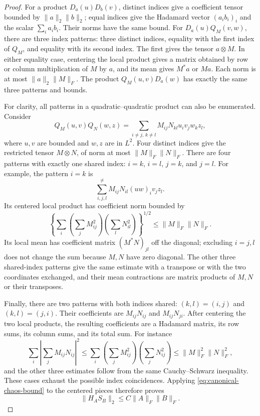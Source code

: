 \begin{proof}
For a product $D_a(u)D_b(v)$, distinct indices give a coefficient
tensor bounded by $\|a\|_2\|b\|_2$; equal indices give the
Hadamard vector $(a_ib_i)_i$ and the scalar $\sum_i a_ib_i$.
Their norms have the same bound.  For $D_a(u)Q_M(v,w)$, there
are three index patterns: three distinct indices, equality with
the first index of $Q_M$, and equality with its second index.
The first gives the tensor $a\otimes M$.  In either equality
case, centering the local product gives a matrix obtained by
row or column multiplication of $M$ by $a$, and its mean gives
$M^*a$ or $Ma$.  Each norm is at most
$\|a\|_2\|M\|_F$.  The product $Q_M(u,v)D_a(w)$ has exactly
the same three patterns and bounds.

For clarity, all patterns in a quadratic--quadratic product can
also be enumerated.  Consider
\[
 Q_M(u,v)Q_N(w,z)
 =\sum_{i\ne j,\,k\ne l}M_{ij}N_{kl}
                         u_i v_j w_k z_l,
\]
where $u,v$ are bounded and $w,z$ are in $L^2$.  Four distinct
indices give the restricted tensor $M\otimes N$, of norm at
most $\|M\|_F\|N\|_F$.  There are four patterns with exactly
one shared index: $i=k$, $i=l$, $j=k$, and $j=l$.
For example, the pattern $i=k$ is
\[
 \sum_{i,j,l}^{\ne}M_{ij}N_{il}(uw)_i v_jz_l.
\]
Its centered local product has coefficient norm bounded by
\[
 \left\{\sum_i\left(\sum_j M_{ij}^2\right)
                    \left(\sum_l N_{il}^2\right)\right\}^{1/2}
 \le\|M\|_F\|N\|_F.
\]
Its local mean has coefficient matrix
$(M^*N)_{jl}$ off the diagonal; excluding $i=j,l$
does not change the sum because $M,N$ have zero diagonal.
The other three shared-index patterns give the same estimate
with a transpose or with the two coordinates exchanged, and
their mean contractions are matrix products of $M,N$ or their
transposes.

Finally, there are two patterns with both indices shared:
$(k,l)=(i,j)$ and $(k,l)=(j,i)$.  Their coefficients are
$M_{ij}N_{ij}$ and $M_{ij}N_{ji}$.  After centering the two
local products, the resulting coefficients are a Hadamard
matrix, its row sums, its column sums, and its total sum.
For instance
\[
 \sum_i\left|\sum_j M_{ij}N_{ij}\right|^2
 \le\sum_i\left(\sum_j M_{ij}^2\right)
            \left(\sum_j N_{ij}^2\right)
 \le\|M\|_F^2\|N\|_F^2,
\]
and the other three estimates follow from the same
Cauchy--Schwarz inequality.  These cases exhaust the possible
index coincidences.  Applying
\eqref{eq:canonical-chaos-bound} to the centered pieces
therefore proves
\begin{equation}
 \|H_AS_B\|_2\le C\|A\|_F\|B\|_F.
 \label{eq:coordinate-function-score-bound}
\end{equation}


\end{proof}
